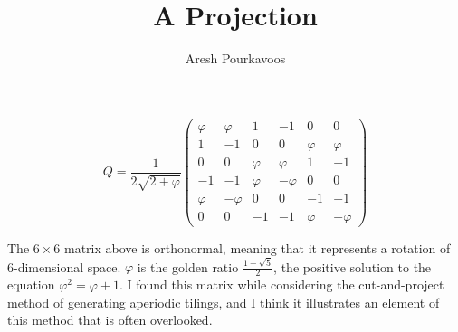 \documentclass{article}
\begin{document}
\title{A Projection}
\author{Aresh Pourkavoos}
\maketitle

\[
Q =
\frac{1}{2\sqrt{2+\varphi}}
\begin{pmatrix}
  \varphi & \varphi & 1 & -1 & 0 & 0 \\
  1 & -1 & 0 & 0 & \varphi & \varphi \\
  0 & 0 & \varphi & \varphi & 1 & -1 \\
  -1 & -1 & \varphi & -\varphi & 0 & 0 \\
  \varphi & -\varphi & 0 & 0 & -1 & -1 \\
  0 & 0 & -1 & -1 & \varphi & -\varphi
\end{pmatrix}
\]

The $6 \times 6$ matrix above is orthonormal,
meaning that it represents a rotation of 6-dimensional space.
$\varphi$ is the golden ratio $\frac{1+\sqrt{5}}{2}$,
the positive solution to the equation $\varphi^2 = \varphi+1$.
I found this matrix while considering the cut-and-project method
of generating aperiodic tilings,
and I think it illustrates an element of this method
that is often overlooked.
\end{document}
